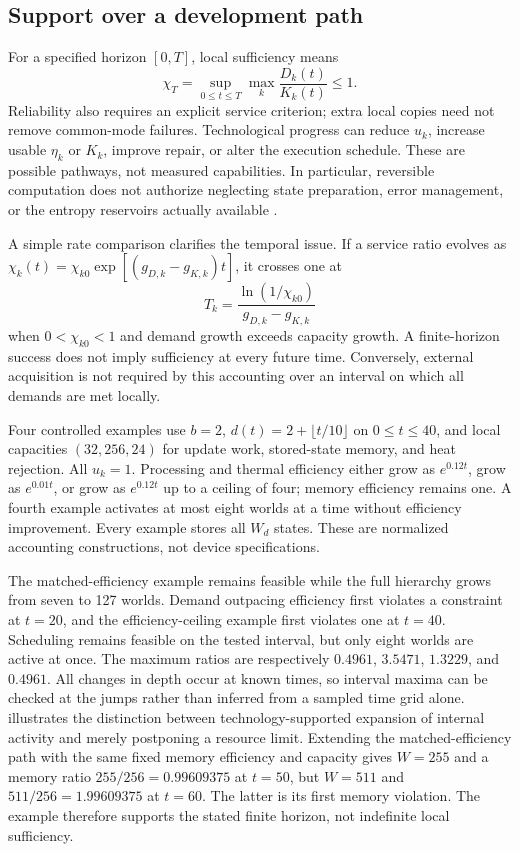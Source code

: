 \subsection{Support over a development path}

For a specified horizon $[0,T]$, local sufficiency means
\begin{equation}
 \chi_T=\sup_{0\leq t\leq T}\max_k\frac{D_k(t)}{K_k(t)}\leq1.
 \label{eq:chi}
\end{equation}
Reliability also requires an explicit service criterion; extra local copies need not remove common-mode failures. Technological progress can reduce $u_k$, increase usable $\eta_k$ or $K_k$, improve repair, or alter the execution schedule. These are possible pathways, not measured capabilities. In particular, reversible computation does not authorize neglecting state preparation, error management, or the entropy reservoirs actually available \citep{Bennett1973,BennettHansonRiedel2019}.

A simple rate comparison clarifies the temporal issue. If a service ratio evolves as $\chi_k(t)=\chi_{k0}\exp[(g_{D,k}-g_{K,k})t]$, it crosses one at
\begin{equation}
 T_k=\frac{\ln(1/\chi_{k0})}{g_{D,k}-g_{K,k}}
 \label{eq:crossing}
\end{equation}
when $0<\chi_{k0}<1$ and demand growth exceeds capacity growth. A finite-horizon success does not imply sufficiency at every future time. Conversely, external acquisition is not required by this accounting over an interval on which all demands are met locally.

Four controlled examples use $b=2$, $d(t)=2+\lfloor t/10\rfloor$ on $0\leq t\leq40$, and local capacities $(32,256,24)$ for update work, stored-state memory, and heat rejection. All $u_k=1$. Processing and thermal efficiency either grow as $e^{0.12t}$, grow as $e^{0.01t}$, or grow as $e^{0.12t}$ up to a ceiling of four; memory efficiency remains one. A fourth example activates at most eight worlds at a time without efficiency improvement. Every example stores all $W_d$ states. These are normalized accounting constructions, not device specifications.

The matched-efficiency example remains feasible while the full hierarchy grows from seven to 127 worlds. Demand outpacing efficiency first violates a constraint at $t=20$, and the efficiency-ceiling example first violates one at $t=40$. Scheduling remains feasible on the tested interval, but only eight worlds are active at once. The maximum ratios are respectively $0.4961$, $3.5471$, $1.3229$, and $0.4961$. All changes in depth occur at known times, so interval maxima can be checked at the jumps rather than inferred from a sampled time grid alone.  illustrates the distinction between technology-supported expansion of internal activity and merely postponing a resource limit. Extending the matched-efficiency path with the same fixed memory efficiency and capacity gives $W=255$ and a memory ratio $255/256=0.99609375$ at $t=50$, but $W=511$ and $511/256=1.99609375$ at $t=60$. The latter is its first memory violation. The example therefore supports the stated finite horizon, not indefinite local sufficiency.

